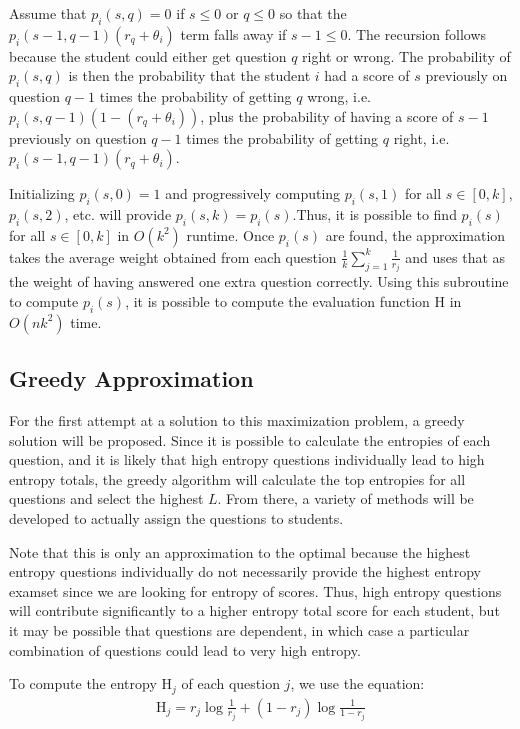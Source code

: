 \documentclass[psamsfonts]{amsart}
\begin{document}
Assume that $p_i(s,q) = 0$ if $s \leq 0$ or $q \leq 0$ so that the $p_i(s-1, q-1) (r_q + \theta_i)$ term falls away if $s-1 \leq 0$. The recursion follows because the student could either get question $q$ right or wrong. The probability of $p_i(s, q)$ is then the probability that the student $i$ had a score of $s$ previously on question $q-1$ times the probability of getting $q$ wrong, i.e. $p_i(s, q-1) (1 - (r_q + \theta_i))$, plus the probability of having a score of $s-1$ previously on question $q-1$ times the probability of getting $q$ right, i.e. $p_i(s-1, q-1) (r_q + \theta_i)$.

Initializing $p_i(s, 0) = 1$ and progressively computing $p_i(s, 1)$ for all $s \in [0,k]$, $p_i(s, 2)$, etc. will provide $p_i(s, k) = p_i(s)$.Thus, it is possible to find $p_i(s)$ for all $s \in [0,k]$ in $O(k^2)$ runtime. Once $p_i(s)$ are found, the approximation takes the average weight obtained from each question $\frac{1}{k} \sum_{j=1}^k \frac{1}{r_j}$ and uses that as the weight of having answered one extra question correctly. Using this subroutine to compute $p_i(s)$, it is possible to compute the evaluation function $\mathrm{H}$ in $O(n k^2)$ time. 

\subsection{Greedy Approximation}

For the first attempt at a solution to this maximization problem, a greedy solution will be proposed. Since it is possible to calculate the entropies of each question, and it is likely that high entropy questions individually lead to high entropy totals, the greedy algorithm will calculate the top entropies for all questions and select the highest $L$. From there, a variety of methods will be developed to actually assign the questions to students. 

Note that this is only an approximation to the optimal because the highest entropy questions individually do not necessarily provide the highest entropy examset since we are looking for entropy of scores. Thus, high entropy questions will contribute significantly to a higher entropy total score for each student, but it may be possible that questions are dependent, in which case a particular combination of questions could lead to very high entropy. 

To compute the entropy $\mathrm{H}_j$ of each question $j$, we use the equation:
\begin{eqnarray}
\mathrm{H}_j = r_j \log \frac{1}{r_j} + (1 - r_j) \log \frac{1}{1 - r_j}
\end{eqnarray}
\end{document}
